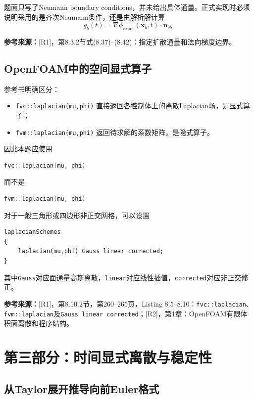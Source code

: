 \documentclass[UTF8,12pt,a4paper]{ctexart}
\numberwithin{equation}{section}
\newcommand{\Rone}{\textnormal{[R1]}}
\newcommand{\Rtwo}{\textnormal{[R2]}}
\newcommand{\source}[1]{%
  \par\smallskip
  \noindent\colorbox{sourcebg}{%
    \parbox{0.955\linewidth}{\raggedright\footnotesize\color{sourcegray}\textbf{参考来源：}#1}%
  }
  \par\smallskip
}
\newcommand{\xf}{\bm x}
\begin{document}
题面只写了Neumann boundary conditions，并未给出具体通量。正式实现时必须说明采用的是齐次Neumann条件，还是由解析解计算
\begin{equation}
  g_b(t)=\nabla\phi_{\mathrm{exact}}(\xf_b,t)\cdot\bm n_{cb}.
  \label{eq:exact_neumann}
\end{equation}

\source{\Rone，第8.3.2节式(8.37)--(8.42)：指定扩散通量和法向梯度边界。}

\subsection{OpenFOAM中的空间显式算子}

参考书明确区分：
\begin{itemize}
  \item \texttt{fvc::laplacian(mu,phi)} 直接返回各控制体上的离散Laplacian场，是显式算子；
  \item \texttt{fvm::laplacian(mu,phi)} 返回待求解的系数矩阵，是隐式算子。
\end{itemize}
因此本题应使用
\begin{lstlisting}[style=solver,language=C++]
fvc::laplacian(mu, phi)
\end{lstlisting}
而不是
\begin{lstlisting}[style=solver,language=C++]
fvm::laplacian(mu, phi)
\end{lstlisting}
对于一般三角形或四边形非正交网格，可以设置
\begin{lstlisting}[style=solver]
laplacianSchemes
{
    laplacian(mu,phi) Gauss linear corrected;
}
\end{lstlisting}
其中\texttt{Gauss}对应面通量高斯离散，\texttt{linear}对应线性插值，\texttt{corrected}对应非正交修正。

\source{\Rone，第8.10.2节，第260--265页，Listing 8.5--8.10：\texttt{fvc::laplacian}、\texttt{fvm::laplacian}及\texttt{Gauss linear corrected}；\Rtwo，第1章：OpenFOAM有限体积面离散和程序结构。}

\newpage
\section{第三部分：时间显式离散与稳定性}

\subsection{从Taylor展开推导向前Euler格式}
\end{document}
